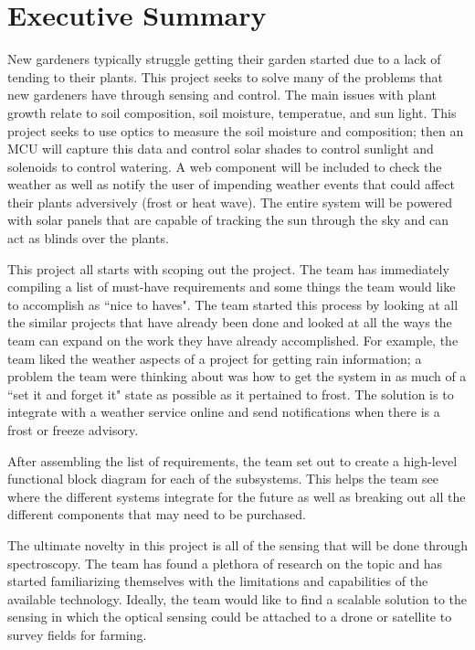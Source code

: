 \documentclass[12pt]{article}
\begin{document}

\tableofcontents
\listoffigures
\listoftables
\pagebreak
{}
%
\section{Executive Summary}                     %
New gardeners typically struggle getting their garden started due to a lack of tending to their plants. This project seeks to solve  many of the problems that new gardeners have through sensing and control. The main issues with plant growth relate to soil composition, soil moisture, temperatue, and sun light. This project seeks to use optics to measure the soil moisture and composition; then an MCU will capture this data and control solar shades to control sunlight and solenoids to control watering. A web component will be included to check the weather as well as notify the user of impending weather events that could affect their plants adversively (frost or heat wave). The entire system will be powered with solar panels that are capable of tracking the sun through the sky and can act as blinds over the plants.

This project all starts with scoping out the project. The team has immediately compiling a list of must-have requirements and some things the team would like to accomplish as ``nice to haves". The team started this process by looking at all the similar projects that have already been done and looked at all the ways the team can expand on the work they have already accomplished. For example, the team liked the weather aspects of a project for getting rain information; a problem the team were thinking about was how to get the system in as much of a ``set it and forget it" state as possible as it pertained to frost. The solution is to integrate with a weather service online and send notifications when there is a frost or freeze advisory.

After assembling the list of requirements, the team set out to create a high-level functional block diagram for each of the subsystems. This helps the team see where the different systems integrate for the future as well as breaking out all the different components that may need to be purchased.

The ultimate novelty in this project is all of the sensing that will be done through spectroscopy. The team has found a plethora of research on the topic and has started familiarizing themselves with the limitations and capabilities of the available technology. Ideally, the team would like to find a scalable solution to the sensing in which the optical sensing could be attached to a drone or satellite to survey fields for farming.
\newpage
\end{document}
